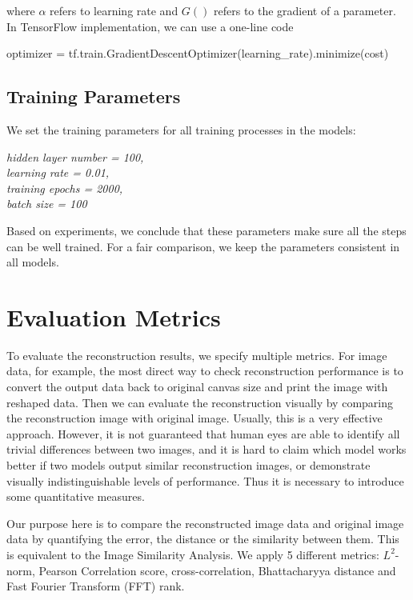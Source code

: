 \documentclass[12pt]{report} %
\begin{document}
where $\alpha$ refers to learning rate and $G()$ refers to the gradient of a parameter. In TensorFlow implementation, we can use a one-line code
\begin{center}
	optimizer = tf.train.GradientDescentOptimizer(learning\_rate).minimize(cost)
\end{center}

\subsection{Training Parameters}
We set the training parameters for all training processes in the models:

\textit{hidden layer number = 100, \\
	learning rate = 0.01, \\
	training epochs = 2000, \\
	batch size = 100}

Based on experiments, we conclude that these parameters make sure all the steps can be well trained. For a fair comparison, we keep the parameters consistent in all models.

\section{Evaluation Metrics}
To evaluate the reconstruction results, we specify multiple metrics. For image data, for example, the most direct way to check reconstruction performance is to convert the output data back to original canvas size and print the image with reshaped data. Then we can evaluate the reconstruction visually by comparing the reconstruction image with original image. Usually, this is a very effective approach. However, it is not guaranteed that human eyes are able to identify all trivial differences between two images, and it is hard to claim which model works better if two models output similar reconstruction images, or demonstrate visually indistinguishable levels of performance. Thus it is necessary to introduce some quantitative measures. 

Our purpose here is to compare the reconstructed image data and original image data by quantifying the error, the distance or the similarity between them. This is equivalent to the Image Similarity Analysis\cite{PCC, CC, ISA}. We apply 5 different metrics: $L^2$-norm\cite{NORM}, Pearson Correlation score\cite{PCC}, cross-correlation\cite{CC}, Bhattacharyya distance\cite{ISA} and Fast Fourier Transform (FFT) rank\cite{ISA}.
\end{document}
